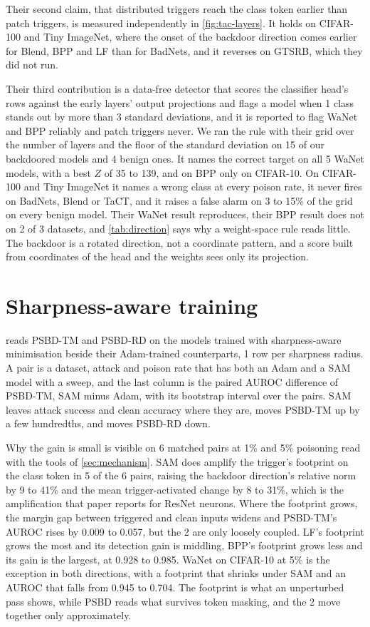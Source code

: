 Their second claim, that distributed triggers reach the class token earlier than patch triggers, is measured independently in \cref{fig:tac-layers}. It holds on CIFAR-100 and Tiny ImageNet, where the onset of the backdoor direction comes earlier for Blend, BPP and LF than for BadNets, and it reverses on GTSRB, which they did not run.

Their third contribution is a data-free detector that scores the classifier head's rows against the early layers' output projections and flags a model when 1 class stands out by more than 3 standard deviations, and it is reported to flag WaNet and BPP reliably and patch triggers never. We ran the rule with their grid over the number of layers and the floor of the standard deviation on 15 of our backdoored models and 4 benign ones. It names the correct target on all 5 WaNet models, with a best $Z$ of 35 to 139, and on BPP only on CIFAR-10. On CIFAR-100 and Tiny ImageNet it names a wrong class at every poison rate, it never fires on BadNets, Blend or TaCT, and it raises a false alarm on 3 to 15\% of the grid on every benign model. Their WaNet result reproduces, their BPP result does not on 2 of 3 datasets, and \cref{tab:direction} says why a weight-space rule reads little. The backdoor is a rotated direction, not a coordinate pattern, and a score built from coordinates of the head and the weights sees only its projection.

\section{Sharpness-aware training}
\label{app:sam}

 reads PSBD-TM and PSBD-RD on the models trained with sharpness-aware minimisation beside their Adam-trained counterparts, 1 row per sharpness radius. A pair is a dataset, attack and poison rate that has both an Adam and a SAM model with a sweep, and the last column is the paired AUROC difference of PSBD-TM, SAM minus Adam, with its bootstrap interval over the pairs. SAM leaves attack success and clean accuracy where they are, moves PSBD-TM up by a few hundredths, and moves PSBD-RD down.

\FloatBarrier

Why the gain is small is visible on 6 matched pairs at 1\% and 5\% poisoning read with the tools of \cref{sec:mechanism}. SAM does amplify the trigger's footprint on the class token in 5 of the 6 pairs, raising the backdoor direction's relative norm by 9 to 41\% and the mean trigger-activated change by 8 to 31\%, which is the amplification that paper reports for ResNet neurons. Where the footprint grows, the margin gap between triggered and clean inputs widens and PSBD-TM's AUROC rises by 0.009 to 0.057, but the 2 are only loosely coupled. LF's footprint grows the most and its detection gain is middling, BPP's footprint grows less and its gain is the largest, at 0.928 to 0.985. WaNet on CIFAR-10 at 5\% is the exception in both directions, with a footprint that shrinks under SAM and an AUROC that falls from 0.945 to 0.704. The footprint is what an unperturbed pass shows, while PSBD reads what survives token masking, and the 2 move together only approximately.

